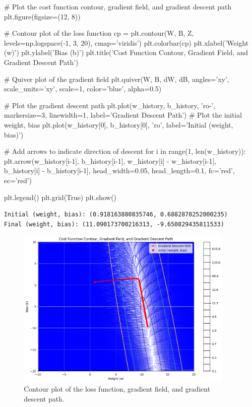 \begin{codeblock}
# Plot the cost function contour, gradient field, and gradient descent path
plt.figure(figsize=(12, 8))

# Contour plot of the loss function
cp = plt.contour(W, B, Z, levels=np.logspace(-1, 3, 20), cmap='viridis')
plt.colorbar(cp)
plt.xlabel('Weight (w)')
plt.ylabel('Bias (b)')
plt.title('Cost Function Contour, Gradient Field, and Gradient Descent Path')

# Quiver plot of the gradient field
plt.quiver(W, B, dW, dB, angles='xy', scale_units='xy', scale=1, color='blue', alpha=0.5)

# Plot the gradient descent path
plt.plot(w_history, b_history, 'ro-', markersize=3, linewidth=1, label='Gradient Descent Path')
# Plot the initial weight, bias
plt.plot(w_history[0], b_history[0], 'ro', label='Initial (weight, bias)')

# Add arrows to indicate direction of descent
for i in range(1, len(w_history)):
    plt.arrow(w_history[i-1], b_history[i-1],
                w_history[i] - w_history[i-1],
                b_history[i] - b_history[i-1],
                head_width=0.05, head_length=0.1, fc='red', ec='red')

plt.legend()
plt.grid(True)
plt.show()
\end{codeblock}

\texttt{\small{Initial (weight, bias): (0.918163880835746, 0.6882870252000235)\\
Final (weight, bias): (11.090173700216313, -9.650829435811533)
}}

\begin{figure}[H]
\centering
\includegraphics[width=300pt]{Regression/img/output_15_1.png}
\caption{Contour plot of the loss function, gradient field, and gradient descent path.}
\label{fig:linear4}
\end{figure}

